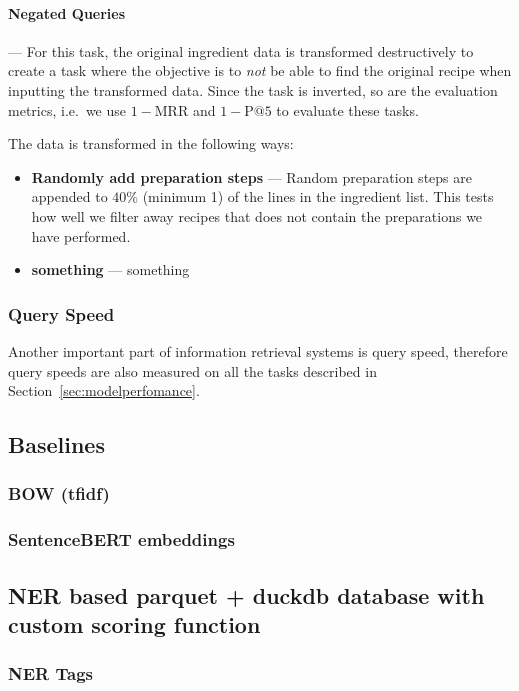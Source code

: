 \documentclass[11pt]{article}
\begin{document}
\paragraph{Negated Queries} --- For this task, the original ingredient data is
transformed destructively to create a task where the objective is to \emph{not}
be able to find the original recipe when inputting the transformed data.
Since the task is inverted, so are the evaluation metrics, i.e.\ we use
$1-\text{MRR}$ and $1-\text{P@5}$ to evaluate these tasks.

The data is transformed in the following ways:
\begin{itemize}
    \item \textbf{Randomly add preparation steps} --- Random preparation steps
        are appended to $40\%$ (minimum 1) of the lines in the ingredient list.
        This tests how well we filter away recipes that does not contain the
        preparations we have performed.
    \item \textbf{something} --- something
\end{itemize}


\subsubsection{Query Speed}
Another important part of information retrieval systems is query speed,
therefore query speeds are also measured on all the tasks described in
Section~\ref{sec:modelperfomance}.

\subsection{Baselines}
\subsubsection{BOW (tfidf)}

\subsubsection{SentenceBERT embeddings}

\subsection{NER based parquet + duckdb database with custom scoring function}

\subsubsection{NER Tags}\label{sec:ner_tags}
\end{document}
